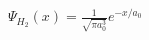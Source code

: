 \documentclass[preview]{standalone}
\begin{document}
\begin{center}
$\Psi_{H_2}(x) = \frac{1}{\sqrt{\pi a_0^3}} e^{-x/a_0} $
\end{center}
\end{document}
